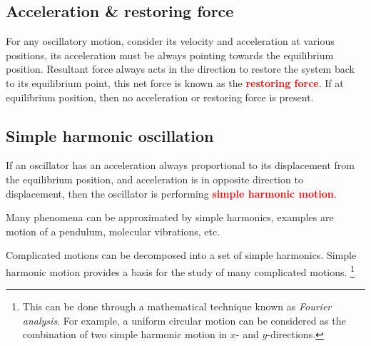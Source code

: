 \documentclass[a4paper,12pt]{book}
\newcounter{example}[chapter]
\newenvironment{ilight}
  {\centering
  	\vspace*{6pt}
  	\begin{tcolorbox}[colframe=Gray,colback=LightGrey!15]
  \setlength{\baselineskip}{\baselineskip}%
  }
  {\end{tcolorbox}\vspace*{-4pt}}
\newcommand{\keypoint}[1]{\textbf{\textcolor{red}{#1}}}
\renewenvironment{marginfigure}[1][]{\begin{figure}[htbp]\centering}{\end{figure}}
\newcommand{\keypoint}[1]{\textbf{\textcolor{red}{#1}}}
\begin{document}
\begin{marginfigure}
	\vspace*{-12pt}
		\centering
{}
\vspace*{-25pt}
\end{marginfigure}

\subsection{Acceleration \& restoring force}
For any oscillatory motion, consider its velocity and acceleration at various positions, its acceleration must be always pointing towards the equilibrium position. Resultant force always acts in the direction to restore the system back to its equilibrium point, this net force is known as the \keypoint{restoring force}. If at equilibrium position, then no acceleration or restoring force is present.

\subsection{Simple harmonic oscillation}

\begin{ilight}
	If an oscillator has an acceleration always proportional to its displacement from the equilibrium position, and acceleration is in opposite direction to displacement, then the oscillator is performing \keypoint{simple harmonic motion}.
\end{ilight}

Many phenomena can be approximated by simple harmonics, examples are motion of a pendulum, molecular vibrations, etc.

Complicated motions can be decomposed into a set of simple harmonics. Simple harmonic motion provides a basis for the study of many complicated motions.
\footnote{This can be done through a mathematical technique known as \emph{Fourier analysis}. For example, a uniform circular motion can be considered as the combination of two simple harmonic motion in $x$- and $y$-directions.}
\end{document}
